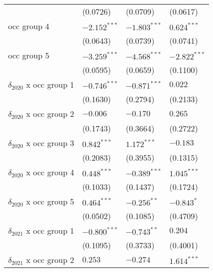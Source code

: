 \begin{tabular}{llll}
                                       &           (0.0726) &           (0.0709) &           (0.0617) \\
occ group 4                            &     $-2.152^{***}$ &     $-1.803^{***}$ &      $0.624^{***}$ \\
                                       &           (0.0643) &           (0.0739) &           (0.0741) \\
occ group 5                            &     $-3.259^{***}$ &     $-4.568^{***}$ &     $-2.822^{***}$ \\
                                       &           (0.0595) &           (0.0659) &           (0.1100) \\
$\delta_{2020}$ x occ group 1          &     $-0.746^{***}$ &     $-0.871^{***}$ &            $0.022$ \\
                                       &           (0.1630) &           (0.2794) &           (0.2133) \\
$\delta_{2020}$ x occ group 2          &           $-0.006$ &           $-0.170$ &            $0.265$ \\
                                       &           (0.1743) &           (0.3664) &           (0.2722) \\
$\delta_{2020}$ x occ group 3          &      $0.842^{***}$ &      $1.172^{***}$ &           $-0.183$ \\
                                       &           (0.2083) &           (0.3955) &           (0.1315) \\
$\delta_{2020}$ x occ group 4          &      $0.448^{***}$ &     $-0.389^{***}$ &      $1.045^{***}$ \\
                                       &           (0.1033) &           (0.1437) &           (0.1724) \\
$\delta_{2020}$ x occ group 5          &      $0.464^{***}$ &      $-0.256^{**}$ &         $-0.843^*$ \\
                                       &           (0.0502) &           (0.1085) &           (0.4709) \\
$\delta_{2021}$ x occ group 1          &     $-0.800^{***}$ &      $-0.743^{**}$ &            $0.204$ \\
                                       &           (0.1095) &           (0.3733) &           (0.4001) \\
$\delta_{2021}$ x occ group 2          &            $0.253$ &           $-0.274$ &      $1.614^{***}$ \\

\end{tabular}
